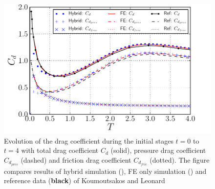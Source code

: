	\begin{figure}[!p]
	\centering
	\includegraphics[width=0.7\linewidth]{./figures/validation/isc/hybrid_ISC_drag_base.pdf}
	\caption{ Evolution of the drag coefficient during the initial stages $t=0$ to $t=4$ with total drag coefficient $C_d$ (solid), pressure drag coefficient $C_{d_{pres}}$ (dashed) and friction drag coefficient $C_{d_{fric}}$ (dotted). The figure compares results of hybrid simulation ({}), FE only simulation ({}) and reference data (\textbf{black}) of Koumoutsakos and Leonard \cite{Koumoutsakos1995a}}
	\label{fig:hybrid_ISC_drag}
	\end{figure}
	
